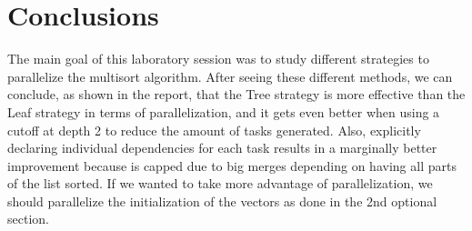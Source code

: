\documentclass[12]{article}
\begin{document}
\section{Conclusions}

The main goal of this laboratory session was to study different strategies to parallelize the multisort algorithm. After seeing these different methods, we can conclude, as shown in the report, that the Tree strategy is more effective than the Leaf strategy in terms of parallelization, and it gets even better when using a cutoff at depth 2 to reduce the amount of tasks generated. Also, explicitly declaring individual dependencies for each task results in a marginally better improvement because is capped due to big merges depending on having all parts of the list sorted. If we wanted to take more advantage of parallelization, we should parallelize the initialization of the vectors as done in the 2nd optional section.
\end{document}

